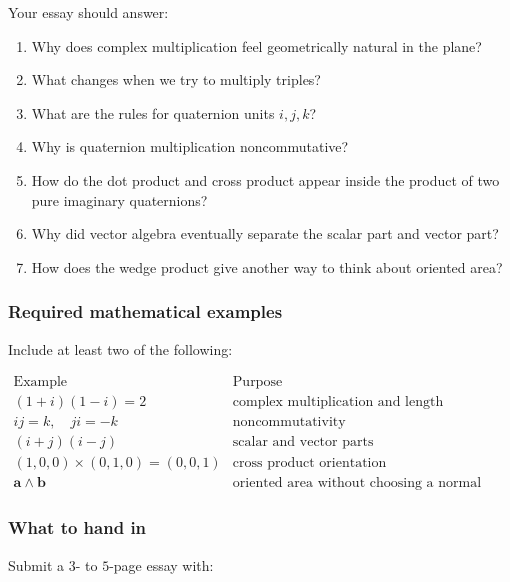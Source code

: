 Your essay should answer:

\begin{enumerate}
\item Why does complex multiplication feel geometrically natural in the plane?

\item What changes when we try to multiply triples?

\item What are the rules for quaternion units \(i,j,k\)?

\item Why is quaternion multiplication noncommutative?

\item How do the dot product and cross product appear inside the product of two pure
imaginary quaternions?

\item Why did vector algebra eventually separate the scalar part and vector part?

\item How does the wedge product give another way to think about oriented area?
\end{enumerate}

\subsubsection*{Required mathematical examples}

Include at least two of the following:

\[
\begin{array}{c|c}
\text{Example} & \text{Purpose} \\ \hline
(1+i)(1-i)=2 & \text{complex multiplication and length}\\[1mm]
ij=k,\quad ji=-k & \text{noncommutativity}\\[1mm]
(i+j)(i-j) & \text{scalar and vector parts}\\[1mm]
(1,0,0)\times(0,1,0)=(0,0,1)
& \text{cross product orientation}\\[1mm]
\mathbf a\wedge\mathbf b
& \text{oriented area without choosing a normal vector}
\end{array}
\]

\subsubsection*{What to hand in}

Submit a \(3\)- to \(5\)-page essay with:

